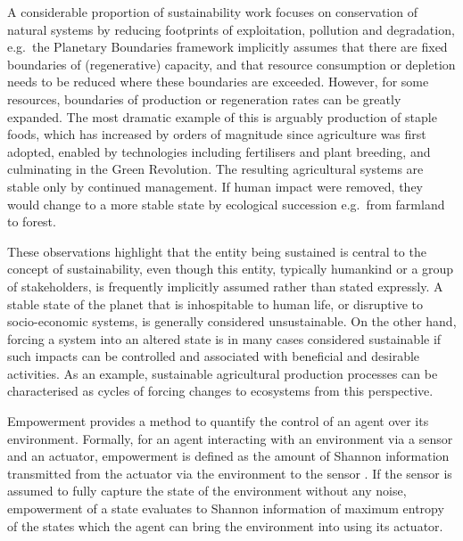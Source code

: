 \documentclass[conference]{IEEEtran}
\begin{document}
A considerable proportion of sustainability work focuses on
conservation of natural systems by reducing footprints of
exploitation, pollution and degradation, e.g.\ the Planetary
Boundaries
framework \cite{Steffen2015_planetaryboundaries}
implicitly assumes that there are fixed boundaries of (regenerative)
capacity, and that resource consumption or depletion needs to be
reduced where these boundaries are exceeded. However, for some
resources, boundaries of production or regeneration rates can be
greatly expanded. The most dramatic example of this is arguably
production of staple foods, which has increased by orders of magnitude
since agriculture was first adopted, enabled by technologies including
fertilisers and plant breeding, and culminating in the Green
Revolution. The resulting agricultural systems are stable only by
continued management. If human impact were removed, they would change
to a more stable state by ecological succession e.g.\ from farmland to
forest.

These observations highlight that the entity being sustained is
central to the concept of sustainability, even though this entity,
typically humankind or a group of stakeholders, is frequently
implicitly assumed rather than stated expressly. A stable state of the
planet that is inhospitable to human life, or disruptive to
socio-economic systems, is generally considered unsustainable. On the
other hand, forcing a system into an altered state is in many cases
considered sustainable if such impacts can be controlled and
associated with beneficial and desirable activities. As an example,
sustainable agricultural production processes can be characterised as
cycles of forcing changes to ecosystems from this perspective.

Empowerment provides a method to quantify the control of an agent over
its environment. Formally, for an agent interacting with an
environment via a sensor and an actuator, empowerment is defined as
the amount of Shannon information transmitted from the actuator via
the environment to the sensor \cite{Klyubin2005_beempowered}. If the
sensor is assumed to fully capture the state of the environment
without any noise, empowerment of a state evaluates to Shannon
information of maximum entropy of the states which the agent can bring
the environment into using its actuator.

\end{document}
